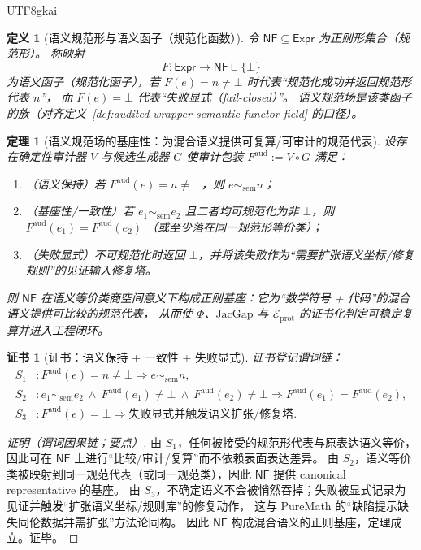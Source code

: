 \documentclass[12pt]{article}
\newtheorem{definition}{定义}[section]
\newtheorem{theorem}{定理}[section]
\newtheorem{Certificate}{证书}[section]
\newcommand{\JacGap}{\ensuremath{\mathrm{JacGap}}} %
\begin{document}
\begin{CJK*}{UTF8}{gkai}
\begin{definition}[语义规范形与语义函子（规范化函数）]
\label{def:semantic-normal-form-functor}
令 $\mathsf{NF}\subseteq\mathsf{Expr}$ 为正则形集合（规范形）。
称映射
\[
  F:\mathsf{Expr}\to \mathsf{NF}\sqcup\{\bot\}
\]
为语义函子（规范化函子），若 $F(e)=n\neq\bot$ 时代表“规范化成功并返回规范形代表 $n$”，
而 $F(e)=\bot$ 代表“失败显式（fail-closed）”。
语义规范场是该类函子的族（对齐定义~\ref{def:audited-wrapper-semantic-functor-field} 的口径）。
\end{definition}

\begin{theorem}[语义规范场的基座性：为混合语义提供可复算/可审计的规范代表]
\label{thm:semantic-normalization-base}
设存在确定性审计器 $V$ 与候选生成器 $G$ 使审计包装
$F^{\mathrm{aud}}:=V\circ G$ 满足：
\begin{enumerate}
  \item （语义保持）若 $F^{\mathrm{aud}}(e)=n\neq\bot$，则 $e\sim_{\mathrm{sem}} n$；
  \item （基座性/一致性）若 $e_1\sim_{\mathrm{sem}} e_2$ 且二者均可规范化为非 $\bot$，则 $F^{\mathrm{aud}}(e_1)=F^{\mathrm{aud}}(e_2)$
  （或至少落在同一规范形等价类）；
  \item （失败显式）不可规范化时返回 $\bot$，并将该失败作为“需要扩张语义坐标/修复规则”的见证输入修复塔。
\end{enumerate}
则 $\mathsf{NF}$ 在语义等价类商空间意义下构成正则基座：它为“数学符号 + 代码”的混合语义提供可比较的规范代表，
从而使 $\Phi$、$\JacGap$ 与 $\mathcal{E}_{\mathrm{prot}}$ 的证书化判定可稳定复算并进入工程闭环。
\end{theorem}

\begin{Certificate}[证书：语义保持 + 一致性 + 失败显式]
\label{cert:semantic-normalization-base}
证书登记谓词链：
\[
\begin{aligned}
  S_1 &: F^{\mathrm{aud}}(e)=n\neq\bot\Rightarrow e\sim_{\mathrm{sem}} n,\\
  S_2 &: e_1\sim_{\mathrm{sem}} e_2\ \wedge\ F^{\mathrm{aud}}(e_1)\neq\bot\ \wedge\ F^{\mathrm{aud}}(e_2)
    \neq\bot\Rightarrow F^{\mathrm{aud}}(e_1)=F^{\mathrm{aud}}(e_2),\\
  S_3 &: F^{\mathrm{aud}}(e)=\bot\Rightarrow \text{失败显式并触发语义扩张/修复塔}.
\end{aligned}
\]
\end{Certificate}

\begin{proof}[证明（谓词因果链；要点）]
由 $S_1$，任何被接受的规范形代表与原表达语义等价，因此可在 $\mathsf{NF}$ 上进行“比较/审计/复算”而不依赖表面表达差异。
由 $S_2$，语义等价类被映射到同一规范代表（或同一规范类），因此 $\mathsf{NF}$ 提供 canonical representative 的基座。
由 $S_3$，不确定语义不会被悄然吞掉；失败被显式记录为见证并触发“扩张语义坐标/规则库”的修复动作，
这与 PureMath 的“缺陷提示缺失同伦数据并需扩张”方法论同构。
因此 $\mathsf{NF}$ 构成混合语义的正则基座，定理成立。证毕。
\end{proof}


\end{CJK*}
\end{document}
